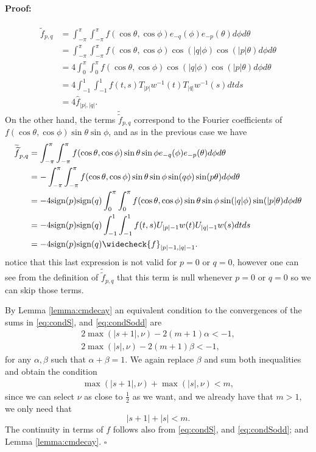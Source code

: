 \documentclass{article}
\newenvironment{proof}{\paragraph{Proof:}}{\hfill$\square$}
\begin{document}
\begin{proof}
\begin{align*}
\widetilde{f}_{p,q} &= \int_{-\pi}^\pi \int_{-\pi} ^\pi f(\cos \theta, \cos \phi)  e_{-q}(\phi) e_{-p}(\theta) d\phi d\theta\\
&= \int_{-\pi}^\pi \int_{-\pi} ^\pi f(\cos \theta, \cos \phi) \cos(|q|\phi) \cos(|p| \theta) d\phi d\theta \\
&= 4 \int_{0}^\pi \int_{0} ^\pi  f(\cos \theta, \cos \phi) \cos(|q|\phi) \cos(|p| \theta) d\phi d\theta \\
& = 4 \int_{-1}^1 \int_{-1}^1 f(t,s) T_{|p|} w^{-1}(t) T_{|q|} w^{-1}(s) dt ds \\
&= 4 \widehat{f}_{|p|,|q|}. 
\end{align*}
On the other hand, the terms $\widetilde{\widetilde{f}}_{p,q}$ correspond to the Fourier coefficients of $f(\cos \theta, \cos \phi) \sin \theta \sin \phi$, and as in the previous case we have
\begin{align*}
\widetilde{\widetilde{f}}_{p,q} &= \int_{-\pi}^\pi \int_{-\pi} ^\pi f(\cos \theta, \cos \phi) \sin \theta \sin \phi e_{-q}(\phi) e_{-p}(\theta) d\phi d\theta\\
&= -\int_{-\pi}^\pi \int_{-\pi} ^\pi f(\cos \theta, \cos \phi)\sin \theta \sin \phi \sin(q\phi) \sin(p \theta) d\phi d\theta \\
&= -4 \text{sign}(p) \text{sign}(q) \int_{0}^\pi \int_{0} ^\pi  f(\cos \theta, \cos \phi) \sin \theta \sin \phi \sin(|q|\phi) \sin(|p| \theta) d\phi d\theta \\
& = -4\text{sign}(p) \text{sign}(q) \int_{-1}^1 \int_{-1}^1 f(t,s) U_{|p|-1} w(t) U_{|q|-1} w(s) dt ds \\
&= -4 \text{sign}(p) \text{sign}(q)\widecheck{f}_{|p|-1,|q|-1}. 
\end{align*}
notice that this last expression is not valid for $p=0$ or $q=0$, however one can see from the definition of $\widetilde{\widetilde{f}}_{p,q}$ that this term is null whenever $p=0$ or $q=0$ so we can skip those terms. 

By Lemma \ref{lemma:cmdecay} an equivalent condition to the convergences of the sums in \eqref{eq:condS}, and \eqref{eq:condSodd} are
\begin{align*}
2 \max(|s+1|, \nu ) - 2(m+1) \alpha < -1, \\ 
2 \max(|s|, \nu ) - 2(m+1) \beta < -1 ,
\end{align*}
for any $\alpha, \beta$ such that $\alpha + \beta =1$. We again replace $\beta$ and sum both inequalities and obtain the condition 
\begin{align*}
\max(|s+1|, \nu ) +\max(|s|, \nu )  < m ,
\end{align*}
since we can select $\nu$ as close to $\frac{1}{2}$ as we want, and we already have that $m > 1$, we only need that 
$$|s+1| + |s| < m. $$
The continuity in terms of $f$ follows also from \eqref{eq:condS}, and \eqref{eq:condSodd}; and Lemma   \ref{lemma:cmdecay}. 
\end{proof}
\end{document}
